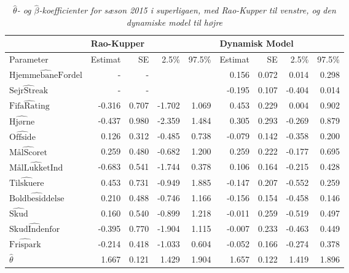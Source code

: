 \documentclass[11pt,a4paper]{article}
\begin{document}
  \begin{table}[ht]
\centering
\begin{adjustbox}{max width=\textwidth}
\begin{tabular}{|l|rrrr|rrrr|}
\hline
\multicolumn{1}{|l|}{} & \multicolumn{4}{l|}{Rao-Kupper} & \multicolumn{4}{l|}{Dynamisk Model} \\
\hline
Parameter & Estimat & SE &2.5\% &97.5\% & Estimat & SE &2.5\% &97.5\%\\
  \hline
    $\hat{\text{HjemmebaneFordel}}$ & -      & -     &      &            & 0.156 & 0.072  &0.014 & 0.298  \\
    $\hat{\text{SejrStreak}}$       & -      & -     &       &           & -0.195 & 0.107 &-0.404 & 0.014 \\
    $\hat{\text{FifaRating}}$       & -0.316 & 0.707 &-1.702 &1.069      & 0.453 & 0.229  &0.004 & 0.902 \\
    $\hat{\text{Hjørne}}$           & -0.437 & 0.980 &-2.359 &1.484      & 0.305 & 0.293  &-0.269 &0.879\\
    $\hat{\text{Offside}}$          &  0.126 & 0.312 &-0.485 &0.738      & -0.079 & 0.142 &-0.358 &0.200 \\
    $\hat{\text{MålScoret}}$        &  0.259 & 0.480 &-0.682 &1.200      & 0.259 & 0.222  &-0.177 &0.695    \\
    $\hat{\text{MålLukketInd}}$     & -0.683 & 0.541 &-1.744 &0.378      & 0.106 & 0.164  &-0.215 & 0.428\\
    $\hat{\text{Tilskuere}}$        &  0.453 & 0.731 &-0.949&1.885       & -0.147 & 0.207 &-0.552 & 0.259\\
    $\hat{\text{Boldbesiddelse}}$   &  0.210 & 0.488 &-0.746 &1.166      & -0.156 & 0.154 &-0.458 & 0.146\\
    $\hat{\text{Skud}}$             &  0.160 & 0.540 &-0.899 &1.218      & -0.011 & 0.259 &-0.519 & 0.497\\
    $\hat{\text{SkudIndenfor}}$     & -0.395 & 0.770 &-1.904 &1.115      & -0.007 & 0.233 &-0.463 & 0.449\\
    $\hat{\text{Frispark}}$         & -0.214 & 0.418 &-1.033 &0.604      & -0.052 & 0.166 &-0.274 & 0.378\\
    $\hat{\theta}$                  & 1.667  & 0.121 &1.429  &1.904      & 1.657 & 0.122  & 1.419 & 1.896\\
   \hline
\end{tabular}
\end{adjustbox}
\caption{\label{tab:Parameterestimater}\textit{$\hat{\theta}$- og $\hat{\beta}$-koefficienter for sæson 2015 i superligaen, med Rao-Kupper til venstre, og den dynamiske model til højre}}
\end{table}
\end{document}
